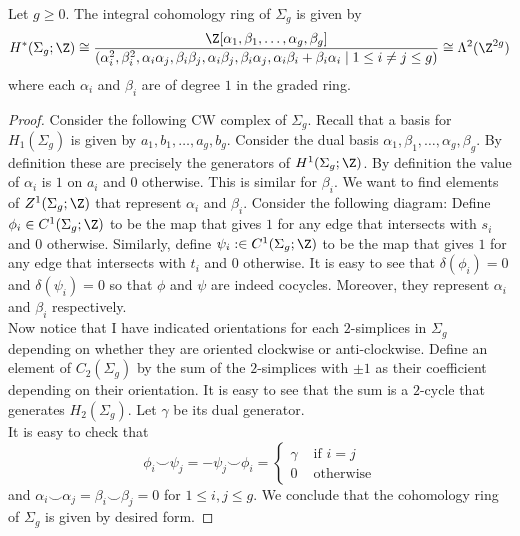 \documentclass[a4paper]{article}
\begin{document}
\begin{prp}{}{} Let $g\geq 0$. The integral cohomology ring of $\Sigma_g$ is given by $$H^\ast(\Sigma_g;\Z)\cong\frac{\Z[\alpha_1,\beta_1,\dots,\alpha_g,\beta_g]}{(\alpha_i^2,\beta_i^2,\alpha_i\alpha_j,\beta_i\beta_j,\alpha_i\beta_j,\beta_i\alpha_j,\alpha_i\beta_i+\beta_i\alpha_i\;|\;1\leq i\neq j\leq g)}\cong\Lambda^2(\Z^{2g})$$ where each $\alpha_i$ and $\beta_i$ are of degree $1$ in the graded ring. 
\begin{proof}
Consider the following CW complex of $\Sigma_g$. Recall that a basis for $H_1(\Sigma_g)$ is given by $a_1,b_1,\dots,a_g,b_g$. Consider the dual basis $\alpha_1,\beta_1,\dots,\alpha_g,\beta_g$. By definition these are precisely the generators of $H^1(\Sigma_g;\Z)$. By definition the value of $\alpha_i$ is $1$ on $a_i$ and $0$ otherwise. This is similar for $\beta_i$. We want to find elements of $Z^1(\Sigma_g;\Z)$ that represent $\alpha_i$ and $\beta_i$. Consider the following diagram: Define $\phi_i\in C^1(\Sigma_g;\Z)$ to be the map that gives $1$ for any edge that intersects with $s_i$ and $0$ otherwise. Similarly, define $\psi_i:\in C^1(\Sigma_g;\Z)$ to be the map that gives $1$ for any edge that intersects with $t_i$ and $0$ otherwise. It is easy to see that $\delta(\phi_i)=0$ and $\delta(\psi_i)=0$ so that $\phi$ and $\psi$ are indeed cocycles. Moreover, they represent $\alpha_i$ and $\beta_i$ respectively. \\

Now notice that I have indicated orientations for each $2$-simplices in $\Sigma_g$ depending on whether they are oriented clockwise or anti-clockwise. Define an element of $C_2(\Sigma_g)$ by the sum of the $2$-simplices with $\pm1$ as their coefficient depending on their orientation. It is easy to see that the sum is a $2$-cycle that generates $H_2(\Sigma_g)$. Let $\gamma$ be its dual generator. \\

It is easy to check that $$\phi_i\smile\psi_j=-\psi_j\smile\phi_i=\begin{cases}
\gamma & \text{ if }i=j\\
0 & \text{ otherwise}
\end{cases}$$
and $\alpha_i\smile\alpha_j=\beta_i\smile\beta_j=0$ for $1\leq i,j\leq g$. We conclude that the cohomology ring of $\Sigma_g$ is given by desired form. 
\end{proof}
\end{prp}
\end{document}
